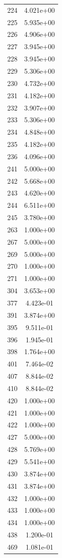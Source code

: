\documentclass[12pt]{article}
\begin{document}
\begin{longtable}{@{}cc@{}}
224 & 4.021e+00 \\
225 & 5.935e+00 \\
226 & 4.906e+00 \\
227 & 3.945e+00 \\
228 & 3.945e+00 \\
229 & 5.306e+00 \\
230 & 4.732e+00 \\
231 & 4.182e+00 \\
232 & 3.907e+00 \\
233 & 5.306e+00 \\
234 & 4.848e+00 \\
235 & 4.182e+00 \\
236 & 4.096e+00 \\
241 & 5.000e+00 \\
242 & 5.668e+00 \\
243 & 4.620e+00 \\
244 & 6.511e+00 \\
245 & 3.780e+00 \\
263 & 1.000e+00 \\
267 & 5.000e+00 \\
269 & 5.000e+00 \\
270 & 1.000e+00 \\
271 & 1.000e+00 \\
304 & 3.653e+00 \\
377 & 4.423e-01 \\
391 & 3.874e+00 \\
395 & 9.511e-01 \\
396 & 1.945e-01 \\
398 & 1.764e+00 \\
401 & 7.464e-02 \\
407 & 8.844e-02 \\
410 & 8.844e-02 \\
420 & 1.000e+00 \\
421 & 1.000e+00 \\
422 & 1.000e+00 \\
427 & 5.000e+00 \\
428 & 5.769e+00 \\
429 & 5.541e+00 \\
430 & 3.874e+00 \\
431 & 3.874e+00 \\
432 & 1.000e+00 \\
433 & 1.000e+00 \\
434 & 1.000e+00 \\
438 & 1.200e-01 \\
469 & 1.081e-01 \\

\end{longtable}
\end{document}
